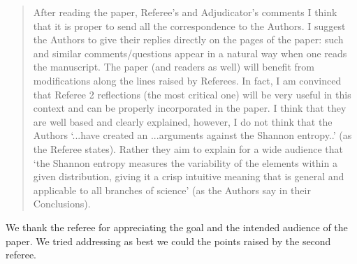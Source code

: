 \documentclass[11pt]{article}
\begin{document}
\begin{quote}
After reading the paper, Referee’s and Adjudicator’s comments I think that it is proper to send all the correspondence to the Authors. I suggest the Authors to give their replies directly on the pages of the paper: such and similar comments/questions appear in a natural way when one reads the manuscript. The paper (and readers as well) will benefit from modifications along the lines raised by Referees. In fact, I am convinced that  Referee 2 reflections  (the most critical one) will be very useful in this context and can be properly incorporated in the paper. I think that they are well based and clearly explained, however, I do not think that the Authors ‘...have created an ...arguments against the Shannon entropy..’ (as the Referee states). Rather they aim to explain for a wide audience that ‘the Shannon entropy measures the variability of the elements within a given distribution, giving it a crisp intuitive meaning that is general and applicable to all branches of science’ (as the Authors say in their Conclusions).
\end{quote}

We thank the referee for appreciating the goal and the intended audience of the paper. We tried addressing as best we could the points raised by the second referee.
\end{document}

